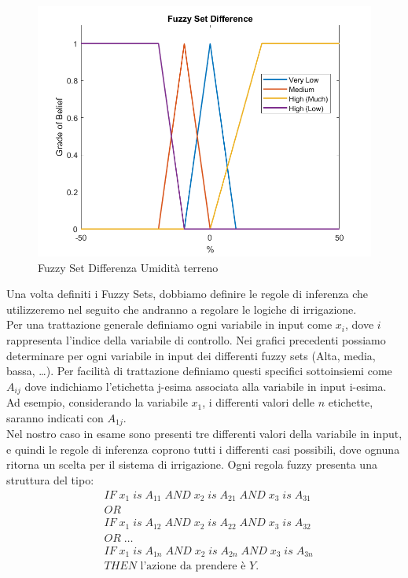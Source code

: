 \documentclass[conference,10pt]{IEEEtran}
\begin{document}
\begin{figure}[ht]
	\centering
	\includegraphics[width=1\linewidth]{images/diff_fs.png}
	\caption{Fuzzy Set Differenza Umidità terreno}
	\label{fig:MAD}
\end{figure}
\newpage
Una volta definiti i Fuzzy Sets, dobbiamo definire le regole di inferenza che utilizzeremo nel seguito che andranno a regolare le logiche di irrigazione.\\
Per una trattazione generale definiamo ogni variabile in input come $x_i$, dove $i$ rappresenta l'indice della variabile di controllo.
Nei grafici precedenti possiamo determinare per ogni variabile in input dei differenti fuzzy sets (Alta, media, bassa, \dots). Per facilità di trattazione definiamo questi specifici sottoinsiemi come $A_{ij}$ dove indichiamo l'etichetta j-esima associata alla variabile in input i-esima. Ad esempio, considerando la variabile $x_1$, i differenti valori delle $n$ etichette, saranno indicati con $A_{1j}$.\\
Nel nostro caso in esame sono presenti tre differenti valori della variabile in input, e quindi le regole di inferenza coprono tutti i differenti casi possibili, dove ognuna ritorna un scelta per il sistema di irrigazione.\newpage
Ogni regola fuzzy presenta una struttura del tipo:\\
\begin{equation*}
\begin{split}
&IF\;x_1\;is\;A_{11}\;AND\;x_2\;is\;A_{21}\;AND\;x_3\;is\;A_{31}\\
&OR \\
&IF\;x_1\;is\;A_{12}\;AND\;x_2\;is\;A_{22}\;AND\;x_3\;is\;A_{32}\\
&OR\;\dots\\
&IF\;x_1\;is\;A_{1n}\;AND\;x_2\;is\;A_{2n}\;AND\;x_3\;is\;A_{3n}\\
&THEN\text{ l'azione da prendere è }Y.
\end{split}
\end{equation*}
\end{document}
